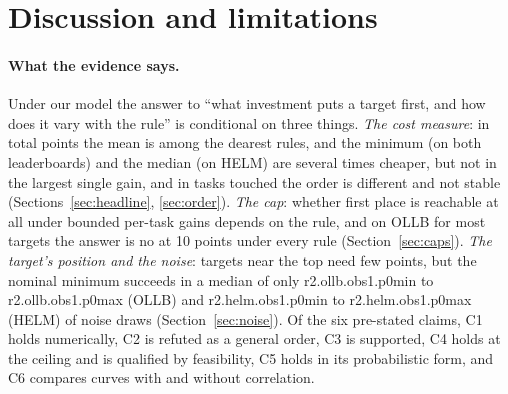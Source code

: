 \section{Discussion and limitations}\label{sec:discussion}
\paragraph{What the evidence says.}
Under our model the answer to ``what investment puts a target first, and how does it vary with the rule'' is conditional on three things. \emph{The cost measure}: in total points the mean is among the dearest rules, and the minimum (on both leaderboards) and the median (on HELM) are several times cheaper, but not in the largest single gain, and in tasks touched the order is different and not stable (Sections~\ref{sec:headline}, \ref{sec:order}). \emph{The cap}: whether first place is reachable at all under bounded per-task gains depends on the rule, and on OLLB for most targets the answer is no at 10 points under every rule (Section~\ref{sec:caps}). \emph{The target's position and the noise}: targets near the top need few points, but the nominal minimum succeeds in a median of only \num{r2.ollb.obs1.p0min} to \num{r2.ollb.obs1.p0max} (OLLB) and \num{r2.helm.obs1.p0min} to \num{r2.helm.obs1.p0max} (HELM) of noise draws (Section~\ref{sec:noise}). Of the six pre-stated claims, C1 holds numerically, C2 is refuted as a general order, C3 is supported, C4 holds at the ceiling and is qualified by feasibility, C5 holds in its probabilistic form, and C6 compares curves with and without correlation.


